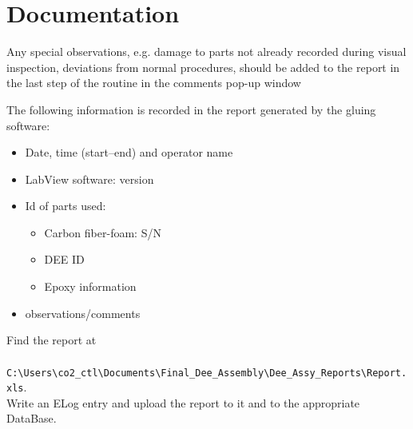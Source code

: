 \documentclass[12pt]{cornelltfpxsop}
\begin{document}
\section{Documentation}

Any special observations, e.g. damage to parts not already recorded during visual inspection, deviations from normal procedures, should be added to the report in the last step of the routine in the comments pop-up window 

The following information is recorded in the report generated by the gluing software:
\begin{itemize}
    \item Date, time (start--end) and operator name
    \item LabView software: version
    \item Id of parts used:
	\begin{itemize}
	    \item Carbon fiber-foam: S/N
	    \item DEE ID
	    \item Epoxy information
	\end{itemize}
    \item observations/comments
\end{itemize}

Find the report at \\ \verb| C:\Users\co2_ctl\Documents\Final_Dee_Assembly\Dee_Assy_Reports\Report.xls|.\\ Write an ELog entry and upload the report to it and to the appropriate DataBase.  
\end{document}
